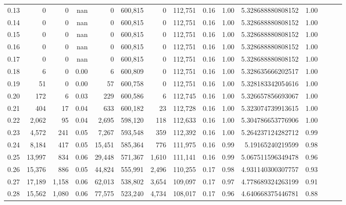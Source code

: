 \begin{tabular}{rrrrrrrrrrrrrrr}
0.13 &       0 &      0 &   nan &        0 &  600,815 &        0 &  112,751 &  0.16 &  1.00 &       5.328688880808152 &      1.00 \\
0.14 &       0 &      0 &   nan &        0 &  600,815 &        0 &  112,751 &  0.16 &  1.00 &       5.328688880808152 &      1.00 \\
0.15 &       0 &      0 &   nan &        0 &  600,815 &        0 &  112,751 &  0.16 &  1.00 &       5.328688880808152 &      1.00 \\
0.16 &       0 &      0 &   nan &        0 &  600,815 &        0 &  112,751 &  0.16 &  1.00 &       5.328688880808152 &      1.00 \\
0.17 &       0 &      0 &   nan &        0 &  600,815 &        0 &  112,751 &  0.16 &  1.00 &       5.328688880808152 &      1.00 \\
0.18 &       6 &      0 &  0.00 &        6 &  600,809 &        0 &  112,751 &  0.16 &  1.00 &       5.328635666202517 &      1.00 \\
0.19 &      51 &      0 &  0.00 &       57 &  600,758 &        0 &  112,751 &  0.16 &  1.00 &       5.328183342054616 &      1.00 \\
0.20 &     172 &      6 &  0.03 &      229 &  600,586 &        6 &  112,745 &  0.16 &  1.00 &       5.326657856693067 &      1.00 \\
0.21 &     404 &     17 &  0.04 &      633 &  600,182 &       23 &  112,728 &  0.16 &  1.00 &       5.323074739913615 &      1.00 \\
0.22 &   2,062 &     95 &  0.04 &    2,695 &  598,120 &      118 &  112,633 &  0.16 &  1.00 &       5.304786653776906 &      1.00 \\
0.23 &   4,572 &    241 &  0.05 &    7,267 &  593,548 &      359 &  112,392 &  0.16 &  1.00 &       5.264237124282712 &      0.99 \\
0.24 &   8,184 &    417 &  0.05 &   15,451 &  585,364 &      776 &  111,975 &  0.16 &  0.99 &        5.19165240219599 &      0.98 \\
0.25 &  13,997 &    834 &  0.06 &   29,448 &  571,367 &    1,610 &  111,141 &  0.16 &  0.99 &       5.067511596349478 &      0.96 \\
0.26 &  15,376 &    886 &  0.05 &   44,824 &  555,991 &    2,496 &  110,255 &  0.17 &  0.98 &       4.931140300307757 &      0.93 \\
0.27 &  17,189 &  1,158 &  0.06 &   62,013 &  538,802 &    3,654 &  109,097 &  0.17 &  0.97 &       4.778689324263199 &      0.91 \\
0.28 &  15,562 &  1,080 &  0.06 &   77,575 &  523,240 &    4,734 &  108,017 &  0.17 &  0.96 &       4.640668375446781 &      0.88 \\

\end{tabular}
